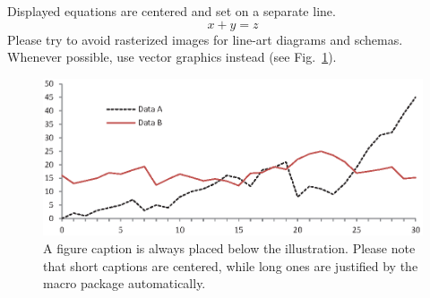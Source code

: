 \documentclass[runningheads]{llncs}
\begin{document}
\noindent Displayed equations are centered and set on a separate
line.
\begin{equation}
x + y = z
\end{equation}
Please try to avoid rasterized images for line-art diagrams and
schemas. Whenever possible, use vector graphics instead (see
Fig.~\ref{fig1}).

\begin{figure}[h]
\includegraphics[width=\textwidth]{fig1.eps}
\caption{A figure caption is always placed below the illustration.
Please note that short captions are centered, while long ones are
justified by the macro package automatically.} \label{fig1}
\end{figure}
\end{document}

